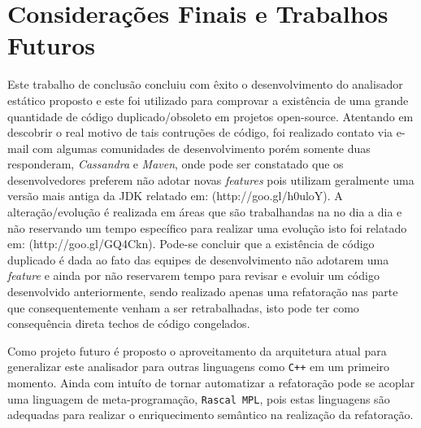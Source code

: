 \chapter{Considerações Finais e Trabalhos Futuros}
Este trabalho de conclus\~{a}o concluiu com \^{e}xito o desenvolvimento do analisador est\'{a}tico proposto e este foi utilizado para comprovar a existência de uma grande quantidade  de código duplicado/obsoleto em projetos open-source. Atentando em descobrir o real motivo de tais contru\c{c}\~{o}es de c\'{o}digo, foi realizado contato via e-mail com algumas comunidades de desenvolvimento por\'{e}m somente duas responderam, \textit{Cassandra} e \textit{Maven}, onde pode ser constatado que os desenvolvedores preferem n\~{a}o adotar novas \textit{features} pois utilizam geralmente uma vers\~{a}o mais antiga da JDK relatado em: (http://goo.gl/h0uloY). A altera\c{c}\~{a}o/evolu\c{c}\~{a}o \'{e} realizada em \'{a}reas que s\~{a}o trabalhandas na no dia a dia e n\~{a}o reservando um tempo espec\'{i}fico para realizar uma evolu\c{c}\~{a}o isto foi relatado em: (http://goo.gl/GQ4Ckn). Pode-se concluir que a exist\^{e}ncia de c\'{o}digo duplicado \'{e} dada ao fato das equipes de desenvolvimento n\~{a}o adotarem uma \textit{feature} e ainda por n\~{a}o reservarem tempo para revisar e evoluir um c\'{o}digo desenvolvido anteriormente, sendo realizado apenas uma refatora\c{c}\~{a}o nas parte que consequentemente venham a ser retrabalhadas, isto pode ter como consequ\^{e}ncia direta techos de c\'{o}digo congelados.


Como projeto futuro \'{e} proposto o aproveitamento da arquitetura atual para generalizar este analisador para  outras linguagens como \texttt{C++} em um primeiro momento. Ainda com intu\'{i}to de tornar automatizar a refatora\c{c}\~{a}o pode se acoplar uma linguagem de meta-programação, \texttt{Rascal MPL}, pois estas linguagens s\~{a}o adequadas para realizar o enriquecimento sem\^{a}ntico na realiza\c{c}\~{a}o da refatora\c{c}\~{a}o.





